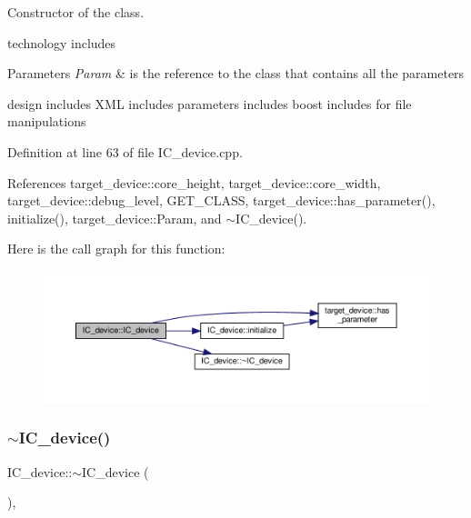 Constructor of the class. 

technology includes


\begin{DoxyParams}{Parameters}
{\em Param} & is the reference to the class that contains all the parameters\\
\hline
\end{DoxyParams}
design includes X\+ML includes parameters\textquotesingle{} includes boost includes for file manipulations 

Definition at line 63 of file I\+C\+\_\+device.\+cpp.



References target\+\_\+device\+::core\+\_\+height, target\+\_\+device\+::core\+\_\+width, target\+\_\+device\+::debug\+\_\+level, G\+E\+T\+\_\+\+C\+L\+A\+SS, target\+\_\+device\+::has\+\_\+parameter(), initialize(), target\+\_\+device\+::\+Param, and $\sim$\+I\+C\+\_\+device().

Here is the call graph for this function\+:
\nopagebreak
\begin{figure}[H]
\begin{center}
\leavevmode
\includegraphics[width=350pt]{dc/d61/classIC__device_a6550c4f2687612ea1e72d0be518b8bb4_cgraph}
\end{center}
\end{figure}
\mbox{\label{classIC__device_a8593f39ee1f3004c2b512ba8ad68655d}} 
\subsubsection{\texorpdfstring{$\sim$\+I\+C\+\_\+device()}{~IC\_device()}}
{\footnotesize\ttfamily I\+C\+\_\+device\+::$\sim$\+I\+C\+\_\+device (\begin{DoxyParamCaption}{ }\end{DoxyParamCaption})\hspace{0.3cm}{\ttfamily [override]}, {\ttfamily [default]}}



